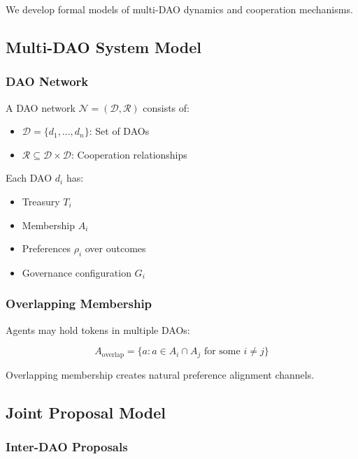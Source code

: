 
We develop formal models of multi-DAO dynamics and cooperation mechanisms.

\subsection{Multi-DAO System Model}

\subsubsection{DAO Network}

A DAO network $\mathcal{N} = (\mathcal{D}, \mathcal{R})$ consists of:
\begin{itemize}
    \item $\mathcal{D} = \{d_1, ..., d_n\}$: Set of DAOs
    \item $\mathcal{R} \subseteq \mathcal{D} \times \mathcal{D}$: Cooperation relationships
\end{itemize}

Each DAO $d_i$ has:
\begin{itemize}
    \item Treasury $T_i$
    \item Membership $A_i$
    \item Preferences $\rho_i$ over outcomes
    \item Governance configuration $G_i$
\end{itemize}

\subsubsection{Overlapping Membership}

Agents may hold tokens in multiple DAOs:

\begin{equation}
A_{\text{overlap}} = \{a : a \in A_i \cap A_j \text{ for some } i \neq j\}
\end{equation}

Overlapping membership creates natural preference alignment channels.

\subsection{Joint Proposal Model}

\subsubsection{Inter-DAO Proposals}

